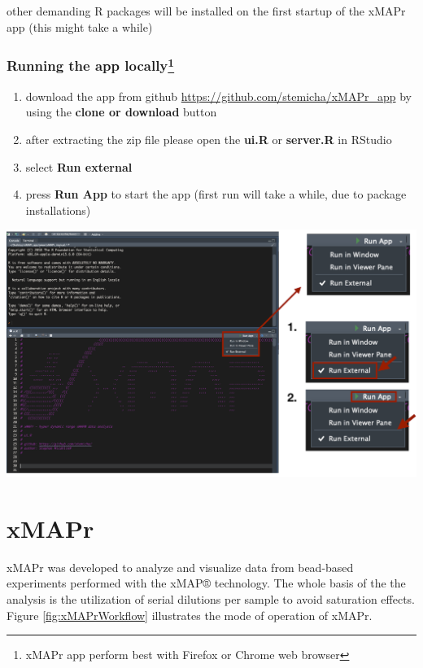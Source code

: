 \documentclass[
]{book}
\providecommand{\tightlist}{%
  \setlength{\itemsep}{0pt}\setlength{\parskip}{0pt}}
\begin{document}
other demanding R packages will be installed on the first startup of the xMAPr app (this might take a while)

\subsection[Running the app locally]{\texorpdfstring{Running the app locally\footnote{xMAPr app perform best with Firefox or Chrome web browser}}{Running the app locally}}\label{running-the-app-locally}

\begin{enumerate}
\def\labelenumi{\arabic{enumi}.}
\tightlist
\item
  download the app from github \url{https://github.com/stemicha/xMAPr_app} by using the \textbf{clone or download} button
\item
  after extracting the zip file please open the \textbf{ui.R} or \textbf{server.R} in RStudio
\item
  select \textbf{Run external}
\item
  press \textbf{Run App} to start the app (first run will take a while, due to package installations)
\end{enumerate}

\begin{center}\includegraphics[width=27.78in]{figures/run_app_locally} \end{center}

\chapter{xMAPr}\label{xmapr}

xMAPr was developed to analyze and visualize data from bead-based experiments performed with the xMAP® technology. The whole basis of the the analysis is the utilization of serial dilutions per sample to avoid saturation effects. Figure \ref{fig:xMAPrWorkflow} illustrates the mode of operation of xMAPr.
\end{document}
